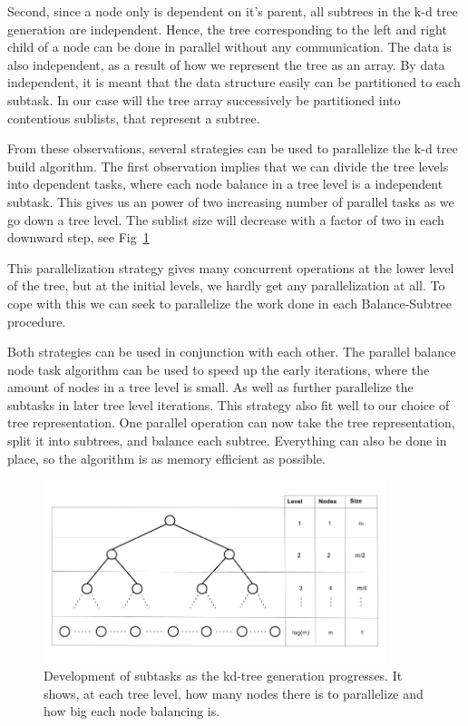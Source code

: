 Second, since a node only is dependent on it's parent, all subtrees in the k-d tree generation are independent. Hence, the tree corresponding to the left and right child of a node can be done in parallel without any communication. The data is also independent, as a result of how we represent the tree as an array. By data independent, it is meant that the data structure easily can be partitioned to each subtask. In our case will the tree array successively be partitioned into contentious sublists, that represent a subtree.

From these observations, several strategies can be used to parallelize the k-d tree build algorithm. The first observation implies that we can divide the tree levels into dependent tasks, where each node balance in a tree level is a independent subtask. This gives us an power of two increasing number of parallel tasks as we go down a tree level. The sublist size will decrease with a factor of two in each downward step, see Fig~\ref{fig:tree_level_development}

This parallelization strategy gives many concurrent operations at the lower level of the tree, but at the initial levels, we hardly get any parallelization at all. To cope with this we can seek to parallelize the work done in each Balance-Subtree procedure.

Both strategies can be used in conjunction with each other. The parallel balance node task algorithm can be used to speed up the early iterations, where the amount of nodes in a tree level is small. As well as further parallelize the subtasks in later tree level iterations. This strategy also fit well to our choice of tree representation. One parallel operation can now take the tree representation, split it into subtrees, and balance each subtree. Everything can also be done in place, so the algorithm is as memory efficient as possible.

\begin{figure}[ht!]
\centering
\includegraphics[width=100mm]{../gfx/Tree_level_development.png}

\caption{Development of subtasks as the kd-tree generation progresses. It shows, at each tree level, how many nodes there is to parallelize and how big each node balancing is. }
\label{fig:tree_level_development}
\end{figure}


